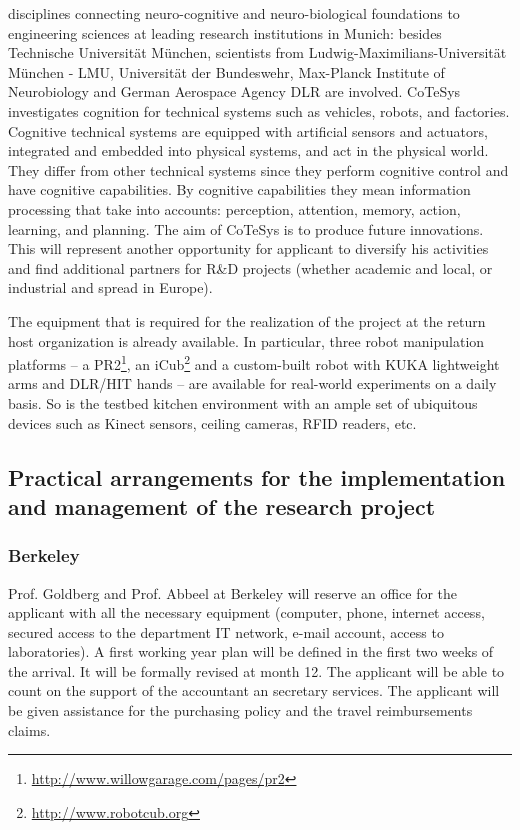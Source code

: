 disciplines    connecting    neuro-cognitive   and    neuro-biological
foundations to  engineering sciences at  leading research institutions
in  Munich: besides  Technische Universit\"at  M\"unchen,  scientists from
Ludwig-Maximilians-Universit\"at   M\"unchen   -   LMU,  Universit\"at   der
Bundeswehr, Max-Planck Institute  of Neurobiology and German Aerospace
Agency  DLR are involved. CoTeSys
investigates cognition for technical systems such as vehicles, robots,
and   factories.  Cognitive  technical   systems  are   equipped  with
artificial  sensors  and   actuators,  integrated  and  embedded  into
physical  systems, and  act in  the physical  world. They  differ from
other technical systems since  they perform cognitive control and have
cognitive   capabilities.   By   cognitive  capabilities   they   mean
information processing that take into accounts: perception, attention,
memory,  action, learning,  and planning.  The  aim of  CoTeSys is  to
produce future  innovations.  This will  represent another opportunity
for applicant to diversify his activities and find additional partners for R\&D
projects  (whether academic  and local,  or industrial  and  spread in
Europe).

The equipment that is required for the realization of the project at the 
return host organization is already available. In
particular, three robot manipulation platforms -- a PR2\footnote{\url{http://www.willowgarage.com/pages/pr2}}, an
iCub\footnote{\url{http://www.robotcub.org}} and a custom-built robot
with KUKA lightweight arms and DLR/HIT hands -- are available for
real-world experiments on a daily basis. So is the testbed kitchen environment with an ample
set of ubiquitous devices such as Kinect sensors, ceiling cameras, RFID readers, etc.
\subsection{Practical arrangements for the implementation and 
management of the research project } 
\subsubsection{Berkeley}
Prof. Goldberg and Prof. Abbeel at Berkeley will reserve an office for the 
applicant with all the necessary equipment (computer, phone, internet access, 
secured access to the department IT network, e-mail account, access to laboratories).
A first working year plan will be defined in the first two weeks of the arrival. 
It will be formally revised at month 12. The applicant will be able to count on 
the support  of the accountant an secretary services. The applicant will be given 
assistance for the purchasing policy and the travel reimbursements claims.
